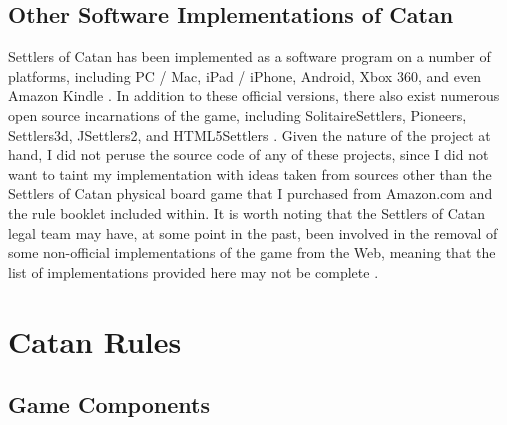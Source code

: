 \documentclass[pageno]{jpaper}
\begin{document}
\begin{doublespacing}
\hypertarget{sec:other_software_implementations_of_catan}{}
\subsection{Other Software Implementations of Catan}

Settlers of Catan has been implemented as a software program on a number of platforms, including PC / Mac, iPad / iPhone, Android, Xbox 360, and even Amazon Kindle \cite{catanwebgames}. In addition to these official versions, there also exist numerous open source incarnations of the game, including SolitaireSettlers, Pioneers, Settlers3d, JSettlers2, and HTML5Settlers \cite{clobusetal,detoni,fugate,maddock,monin}. Given the nature of the project at hand, I did not peruse the source code of any of these projects, since I did not want to taint my implementation with ideas taken from sources other than the Settlers of Catan physical board game that I purchased from Amazon.com and the rule booklet included within. It is worth noting that the Settlers of Catan legal team may have, at some point in the past, been involved in the removal of some non-official implementations of the game from the Web, meaning that the list of implementations provided here may not be complete \cite{masnick2011}.

\hypertarget{sec:catan_rules}{}
\section{Catan Rules \cite{catanwebrules}}

\hypertarget{sec:game_components}{}
\subsection{Game Components}


\end{doublespacing}
\end{document}
